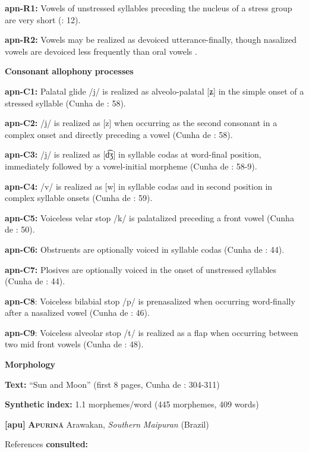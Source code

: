 \begin{styleBody}
\textbf{apn-R1:} Vowels of unstressed syllables preceding the nucleus of a stress group are very short (\citealt{BurgessHam1968}: 12).

\textbf{apn-R2:} Vowels may be realized as devoiced utterance-finally, though nasalized vowels are devoiced less frequently than oral vowels \citep[7]{Ham2009}.

\textbf{Consonant} \textbf{allophony} \textbf{processes}

\textbf{apn-C1:} Palatal glide /j/ is realized as alveolo-palatal [ʑ] in the simple onset of a stressed syllable (Cunha de \citealt{Oliveira2005}: 58).

\textbf{apn-C2:} /j/ is realized as [z] when occurring as the second consonant in a complex onset and directly preceding a vowel (Cunha de \citealt{Oliveira2005}: 58).

\textbf{apn-C3:} /j/ is realized as [d͡ʒ] in syllable codas at word-final position, immediately followed by a vowel-initial morpheme (Cunha de \citealt{Oliveira2005}: 58-9).

\textbf{apn-C4:} /v/ is realized as [w] in syllable codas and in second position in complex syllable onsets (Cunha de \citealt{Oliveira2005}: 59).

\textbf{apn-C5:} Voiceless velar stop /k/ is palatalized preceding a front vowel (Cunha de \citealt{Oliveira2005}: 50).

\textbf{apn-C6:} Obstruents are optionally voiced in syllable codas (Cunha de \citealt{Oliveira2005}: 44).

\textbf{apn-C7:} Plosives are optionally voiced in the onset of unstressed syllables (Cunha de \citealt{Oliveira2005}: 44).

\textbf{apn-C8}: Voiceless bilabial stop /p/ is prenasalized when occurring word-finally after a nasalized vowel (Cunha de \citealt{Oliveira2005}: 46).

\textbf{apn-C9}: Voiceless alveolar stop /t/ is realized as a flap when occurring between two mid front vowels (Cunha de \citealt{Oliveira2005}: 48).

\textbf{Morphology}

\textbf{Text:} “Sun and Moon” (first 8 pages, Cunha de \citealt{Oliveira2005}: 304-311)

\textbf{Synthetic} \textbf{index:} 1.1 morphemes/word (445 morphemes, 409 words)

\textbf{[apu]}   \textbf{\textsc{Apurinã}}  Arawakan, \textit{Southern} \textit{Maipuran} (Brazil)

References \textbf{consulted:} \citet{Facundes2000}


\end{styleBody}
